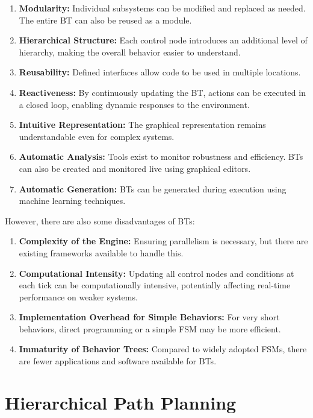 \begin{enumerate}
  \item \textbf{Modularity:} Individual subsystems can be modified and replaced as needed. The entire BT can also be reused as a module.
  \item \textbf{Hierarchical Structure:} Each control node introduces an additional level of hierarchy, making the overall behavior easier to understand.
  \item \textbf{Reusability:} Defined interfaces allow code to be used in multiple locations.
  \item \textbf{Reactiveness:} By continuously updating the BT, actions can be executed in a closed loop, enabling dynamic responses to the environment.
  \item \textbf{Intuitive Representation:} The graphical representation remains understandable even for complex systems.
  \item \textbf{Automatic Analysis:} Tools exist to monitor robustness and efficiency. BTs can also be created and monitored live using graphical editors.
  \item \textbf{Automatic Generation:} BTs can be generated during execution using machine learning techniques.
\end{enumerate}

However, there are also some disadvantages of BTs:

\begin{enumerate}
  \item \textbf{Complexity of the Engine:} Ensuring parallelism is necessary, but there are existing frameworks available to handle this.
  \item \textbf{Computational Intensity:} Updating all control nodes and conditions at each tick can be computationally intensive, potentially affecting real-time performance on weaker systems.
  \item \textbf{Implementation Overhead for Simple Behaviors:} For very short behaviors, direct programming or a simple FSM may be more efficient.
  \item \textbf{Immaturity of Behavior Trees:} Compared to widely adopted FSMs, there are fewer applications and software available for BTs.
\end{enumerate}


\section{Hierarchical Path Planning}
\label{sec:hierarchical_planning}

